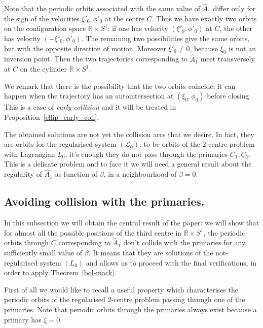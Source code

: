 \documentclass[a4paper]{article}
\begin{document}
Note that the periodic orbits associated with the same value of
$\hat{A}_1$ differ only for the sign of the velocities
$\xi'_0,\phi'_0$ at the centre $C$.  Thus we have exactly two orbits
on the configuration space ${\mathbb{R}} \times S^1$: if one has velocity
$(\xi'_0,\phi'_0)$ at $C$, the other has velocity
$(-\xi'_0,\phi'_0)$. The remaining two possibilities give the same
orbits, but with the opposite direction of motion. Moreover
$\xi'_0\neq 0$, because $\xi_0$ is not an inversion point. Then the
two trajectories corresponding to $\hat{A}_1$ meet transversely at $C$
on the cylinder ${\mathbb{R}} \times S^1$.

We remark that there is the possibility that the two orbits coincide:
it can happen when the trajectory has an autointersection at
$(\xi_0,\phi_0)$ before closing. This is a case of \emph{early
  collision} and it will be treated in
Proposition~\ref{ellip_early_coll}.

The obtained solutions are not yet the collision arcs that we
desire. In fact, they are orbits for the regularised system
$(\mathcal{L}_0)$: to be orbits of the 2-centre problem with
Lagrangian $L_0$, it's enough they do not pass through the primaries
$C_1,C_2$.  This is a delicate problem and to face it we will need
a general result about the regularity of $\hat{A}_1$ as function
of $\beta$, in a neighbourhood of $\beta = 0$.

\subsection{Avoiding collision with the primaries.}
\label{collision_primaries}
In this subsection we will obtain the central result of the paper: we
will show that for almost all the possible positions of the third
centre in ${\mathbb{R}} \times S^1$, the periodic orbits through $C$
corresponding to $\hat{A}_1$ don't collide with the primaries for any
sufficiently small value of $\beta$.  It means that they are solutions
of the not-regularised system $(L_0)$ and allows us to proceed with
the final verifications, in order to apply Theorem~\ref{bol-mack}.

First of all we would like to recall a useful property which
characterises the periodic orbits of the regularised 2-centre problem
passing through one of the primaries. Note that periodic orbits
through the primaries always exist because a primary has $\xi=0$.
\end{document}
